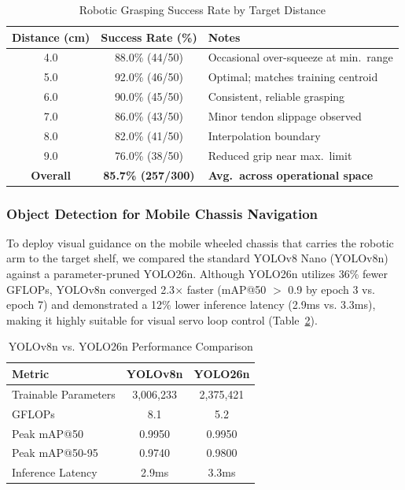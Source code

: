 \documentclass[conference]{IEEEtran}
\begin{document}
\begin{table}[htbp]
\caption{Robotic Grasping Success Rate by Target Distance}
\label{tab:grasp_success}
\centering
\begin{tabular}{cc>{\raggedright\arraybackslash}p{3.5cm}}
\toprule
\textbf{Distance (cm)} & \textbf{Success Rate (\%)} & \textbf{Notes} \\
\midrule
4.0 & 88.0\% (44/50) & Occasional over-squeeze at min.\ range \\
5.0 & 92.0\% (46/50) & Optimal; matches training centroid \\
6.0 & 90.0\% (45/50) & Consistent, reliable grasping \\
7.0 & 86.0\% (43/50) & Minor tendon slippage observed \\
8.0 & 82.0\% (41/50) & Interpolation boundary \\
9.0 & 76.0\% (38/50) & Reduced grip near max.\ limit \\
\midrule
\textbf{Overall} & \textbf{85.7\% (257/300)} & \textbf{Avg.\ across operational space} \\
\bottomrule
\end{tabular}
\end{table}

\subsubsection{Object Detection for Mobile Chassis Navigation}
To deploy visual guidance on the mobile wheeled chassis that carries the robotic arm to the target shelf, we compared the standard YOLOv8 Nano (YOLOv8n)~\cite{yolo} against a parameter-pruned YOLO26n. Although YOLO26n utilizes 36\% fewer GFLOPs, YOLOv8n converged 2.3$\times$ faster (mAP@50 $>$ 0.9 by epoch 3 vs. epoch 7) and demonstrated a 12\% lower inference latency (2.9ms vs. 3.3ms), making it highly suitable for visual servo loop control (Table~\ref{tab:yolo_comparison}).

\begin{table}[htbp]
\caption{YOLOv8n vs. YOLO26n Performance Comparison}
\label{tab:yolo_comparison}
\centering
\begin{tabular}{lcc}
\toprule
\textbf{Metric} & \textbf{YOLOv8n} & \textbf{YOLO26n} \\
\midrule
Trainable Parameters & 3,006,233 & 2,375,421 \\
GFLOPs & 8.1 & 5.2 \\
Peak mAP@50 & 0.9950 & 0.9950 \\
Peak mAP@50-95 & 0.9740 & 0.9800 \\
Inference Latency & 2.9ms & 3.3ms \\
\bottomrule
\end{tabular}
\end{table}
\end{document}
